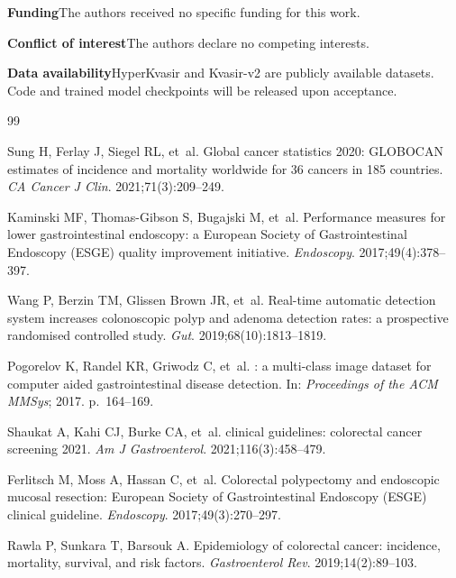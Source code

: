 \documentclass[11pt,a4paper]{article}
\begin{document}
\noindent\textbf{Funding}\quad The authors received no specific funding
for this work.

\noindent\textbf{Conflict of interest}\quad The authors declare no
competing interests.

\noindent\textbf{Data availability}\quad HyperKvasir and Kvasir-v2 are
publicly available datasets. Code and trained model checkpoints will be
released upon acceptance.


\begin{thebibliography}{99}

Sung H, Ferlay J, Siegel RL, et~al.
\newblock Global cancer statistics 2020: {GLOBOCAN} estimates of incidence and
  mortality worldwide for 36 cancers in 185 countries.
\newblock \emph{CA Cancer J Clin}. 2021;71(3):209--249.

Kaminski MF, Thomas-Gibson S, Bugajski M, et~al.
\newblock Performance measures for lower gastrointestinal endoscopy: a
  {European Society of Gastrointestinal Endoscopy (ESGE)} quality improvement
  initiative.
\newblock \emph{Endoscopy}. 2017;49(4):378--397.

Wang P, Berzin TM, Glissen Brown JR, et~al.
\newblock Real-time automatic detection system increases colonoscopic polyp and
  adenoma detection rates: a prospective randomised controlled study.
\newblock \emph{Gut}. 2019;68(10):1813--1819.

Pogorelov K, Randel KR, Griwodz C, et~al.
: a multi-class image dataset for computer aided
  gastrointestinal disease detection.
\newblock In: \emph{Proceedings of the ACM MMSys}; 2017. p.~164--169.

Shaukat A, Kahi CJ, Burke CA, et~al.
 clinical guidelines: colorectal cancer screening 2021.
\newblock \emph{Am J Gastroenterol}. 2021;116(3):458--479.

Ferlitsch M, Moss A, Hassan C, et~al.
\newblock Colorectal polypectomy and endoscopic mucosal resection: {European
  Society of Gastrointestinal Endoscopy (ESGE)} clinical guideline.
\newblock \emph{Endoscopy}. 2017;49(3):270--297.

Rawla P, Sunkara T, Barsouk A.
\newblock Epidemiology of colorectal cancer: incidence, mortality, survival,
  and risk factors.
\newblock \emph{Gastroenterol Rev}. 2019;14(2):89--103.


\end{thebibliography}
\end{document}
